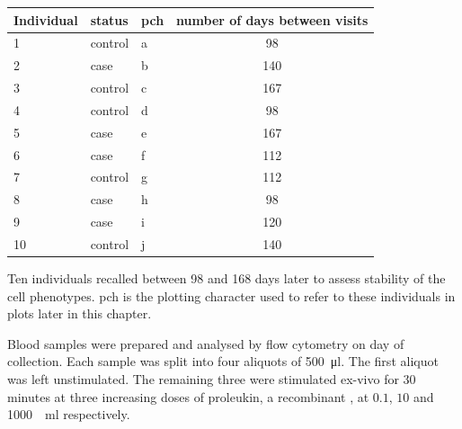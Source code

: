 \begin{table}[ht]
\centering
\begin{tabular}{lllc}
  \hline
Individual & status  & pch & number of days between visits \\
  \hline
1          & control & a   & 98 \\
2          & case    & b   & 140 \\
3          & control & c   & 167 \\
4          & control & d   & 98 \\
5          & case    & e   & 167 \\
6          & case    & f   & 112 \\
7          & control & g   & 112 \\
8          & case    & h   & 98 \\
9          & case    & i   & 120 \\
10         & control & j   & 140 \\
   \hline
\end{tabular}
{Ten individuals recalled between 98 and 168 days later to assess stability of the cell phenotypes. }
{
pch is the plotting character used to refer to these individuals in plots later in this chapter.
}
\end{table}
Blood samples were prepared and analysed by flow cytometry on day of collection.
Each sample was split into four aliquots of \SI{500}{\micro\litre}.
The first aliquot was left unstimulated.
The remaining three were stimulated ex-vivo for 30 minutes at three increasing doses of proleukin, a recombinant , at $0.1$, $10$ and \SI{1000}{\unit\per\milli\litre} respectively.

